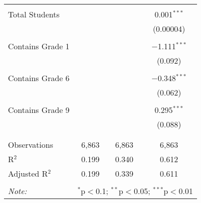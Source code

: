 \begin{table}[!htbp]
\begin{tabular}{@{\extracolsep{-2pt}}lccc}
  & & & \\ 
 Total Students &  &  & 0.001$^{***}$ \\ 
  &  &  & (0.00004) \\ 
  & & & \\ 
 Contains Grade 1 &  &  & $-$1.111$^{***}$ \\ 
  &  &  & (0.092) \\ 
  & & & \\ 
 Contains Grade 6 &  &  & $-$0.348$^{***}$ \\ 
  &  &  & (0.062) \\ 
  & & & \\ 
 Contains Grade 9 &  &  & 0.295$^{***}$ \\ 
  &  &  & (0.088) \\ 
  & & & \\ 
\hline \\[-1.8ex] 
Observations & 6,863 & 6,863 & 6,863 \\ 
R$^{2}$ & 0.199 & 0.340 & 0.612 \\ 
Adjusted R$^{2}$ & 0.199 & 0.339 & 0.611 \\ 
\hline 
\hline \\[-1.8ex] 
\textit{Note:}  & \multicolumn{3}{r}{$^{*}$p$<$0.1; $^{**}$p$<$0.05; $^{***}$p$<$0.01} \\ 
\end{tabular} 
\end{table} 
